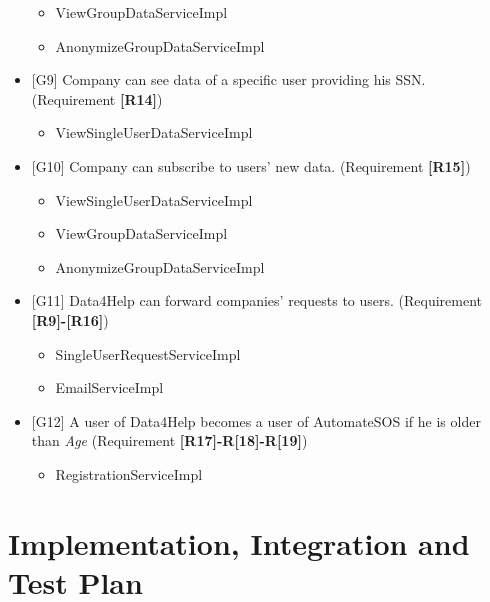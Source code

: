 \documentclass{article}
\begin{document}
\begin{itemize}
	\begin{itemize}
	\item ViewGroupDataServiceImpl
	\item AnonymizeGroupDataServiceImpl
	\end{itemize}
	\item {[G9]} Company can see data of a specific user providing his SSN. (Requirement \textbf{[R14]})
	\begin{itemize}
	\item ViewSingleUserDataServiceImpl
	\end{itemize}
	\item {[G10]} Company can subscribe to users' new data. (Requirement \textbf{[R15]})
	\begin{itemize}
	\item ViewSingleUserDataServiceImpl	
	\item ViewGroupDataServiceImpl
	\item AnonymizeGroupDataServiceImpl
	\end{itemize}
	\item {[G11]} Data4Help can forward companies' requests to users. (Requirement \textbf{[R9]-[R16]})
	\begin{itemize}
	\item SingleUserRequestServiceImpl
	\item EmailServiceImpl
	\end{itemize}
	\item {[G12]} A user of Data4Help becomes a user of AutomateSOS if he is older than \emph{Age} (Requirement \textbf{[R17]-R[18]-R[19]})
	\begin{itemize}
	\item RegistrationServiceImpl
	\end{itemize}
\end{itemize}
\newpage
\section{Implementation, Integration and Test Plan}
\end{document}
